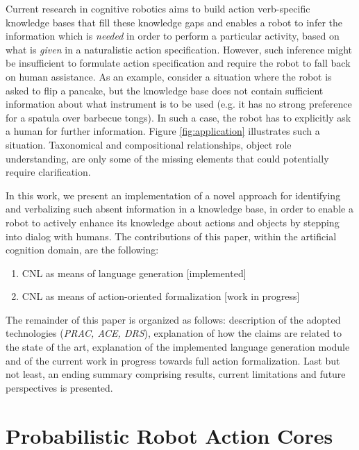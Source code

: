 \documentclass[oribibl]{llncs}
\begin{document}
Current research in cognitive robotics aims to build action 
verb-specific knowledge bases that fill these knowledge gaps and 
enables a robot to infer the information which is \textit{needed} in 
order to perform a particular activity, based on what is \textit 
{given} in a naturalistic action specification. However, such 
inference might be insufficient to formulate action specification and require 
the robot to fall back on human assistance. As an example, consider a situation where 
the robot is asked to flip a pancake, but the knowledge base does 
not contain sufficient information about what instrument is to be used 
(e.g. it has no strong preference for a spatula over barbecue 
tongs). In such a case, the robot has to explicitly ask a human for 
further information. Figure \ref{fig:application} illustrates such a 
situation. Taxonomical and compositional relationships, object role 
understanding, are only some of the missing elements that could 
potentially require clarification. 

In this work, we present an implementation of a novel approach for 
identifying and verbalizing such absent information in a knowledge
 base, in order to enable a robot to actively enhance its knowledge
  about actions and objects by stepping into dialog with humans.
The contributions of this paper, within the artificial cognition domain,
 are the following:
\begin{enumerate}
    \item CNL as means of language generation \hfill [implemented]
    \item CNL as means of action-oriented formalization \hfill [work in progress]
\end{enumerate}
The remainder of this paper is organized as follows: 
description of the adopted technologies (\textit{PRAC, ACE, DRS}), 
explanation of how the claims are related to the state of the art, 
explanation of the implemented language generation module and of the current work
 in progress towards full action formalization. Last but not least, 
 an ending summary comprising results, current limitations and future perspectives is presented.

\section{Probabilistic Robot Action Cores}
\end{document}
